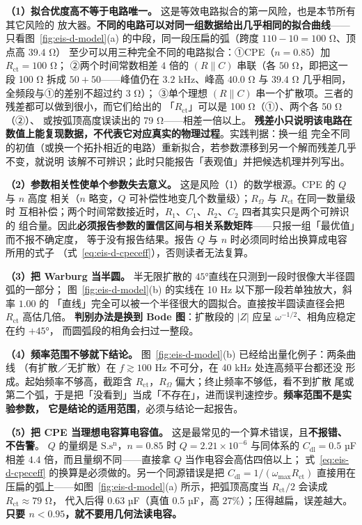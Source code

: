 \begin{pitfall}
\textbf{（1）拟合优度高不等于电路唯一。} 这是等效电路拟合的第一风险，也是本节所有其它风险的
放大器。\textbf{不同的电路可以对同一组数据给出几乎相同的拟合曲线}——只看图~\ref{fig:eis-d-model}(a)
的中段，同一段压扁的弧（跨度 $110-10=100$ \unit{\ohm}、顶点高 $39.4$ \unit{\ohm}）
至少可以用三种完全不同的电路拟合：①CPE（$n=0.85$）加 $R_{\mathrm{ct}}=100$ \unit{\ohm}；
②两个时间常数相差 $4$ 倍的 $(R\parallel C)$ 串联（各 $50$ \unit{\ohm}，即把这一段
100 \unit{\ohm} 拆成 $50+50$——峰值仍在 $3.2$ kHz、峰高 $40.0$ \unit{\ohm} 与
$39.4$ \unit{\ohm} 几乎相同，全频段与①的差别不超过约 $3$ \unit{\ohm}）；
③单个理想 $(R\parallel C)$ 串一个扩散项。三者的残差都可以做到很小，而它们给出的
「$R_{\mathrm{ct}}$」可以是 100 \unit{\ohm}（①）、两个各 50 \unit{\ohm}（②）、
或按弧顶高度误读出的 79 \unit{\ohm}——相差一倍以上。
\textbf{残差小只说明该电路在数值上能复现数据，不代表它对应真实的物理过程}。实践判据：换一组
完全不同的初值（或换一个拓扑相近的电路）重新拟合，若参数漂移到另一个解而残差几乎不变，就说明
该解不可辨识；此时只能报告「表观值」并把候选机理并列写出。

\textbf{（2）参数相关性使单个参数失去意义。} 这是风险（1）的数学根源。CPE 的 $Q$ 与 $n$ 高度
相关（$n$ 略变，$Q$ 可补偿性地变几个数量级）；$R_{\Omega}$ 与 $R_{\mathrm{ct}}$ 在同一数量级时
互相补偿；两个时间常数接近时，$R_{1}$、$C_{1}$、$R_{2}$、$C_{2}$ 四者其实只是两个可辨识的
组合量。因此\textbf{必须报告参数的置信区间与相关系数矩阵}——只报一组「最优值」而不报不确定度，
等于没有报告结果。报告 $Q$ 与 $n$ 时必须同时给出换算成电容所用的式子
（式~\eqref{eq:eis-d-cpeceff}），否则读者无法复算。

\textbf{（3）把 Warburg 当半圆。} 半无限扩散的 $45$°直线在只测到一段时很像大半径圆弧的一部分；
图~\ref{fig:eis-d-model}(b) 的实线在 10 Hz 以下那一段若单独放大，斜率 $1.00$ 的
「直线」完全可以被一个半径很大的圆拟合。直接按半圆读直径会把 $R_{\mathrm{ct}}$ 高估几倍。
\textbf{判别办法是换到 Bode 图}：扩散段的 $|Z|$ 应呈 $\omega^{-1/2}$、相角应稳定在约 $+45$°，
而圆弧段的相角会扫过一整段。

\textbf{（4）频率范围不够就下结论。} 图~\ref{fig:eis-d-model}(b) 已经给出量化例子：两条曲线
（有扩散／无扩散）在 $f\gtrsim 100$ Hz 不可分，在 40 kHz 处连高频平台都还没
形成。起始频率不够高，截距含 $R_{\mathrm{ct}}$，$R_{\Omega}$ 偏大；终止频率不够低，看不到扩散
尾或第二个弧，于是把「没看到」当成「不存在」，进而误判速控步。\textbf{频率范围不是实验参数，
它是结论的适用范围}，必须与结论一起报告。

\textbf{（5）把 CPE 当理想电容算电容值。} 这是最常见的一个算术错误，且\textbf{不报错、不告警}。
$Q$ 的量纲是 $\mathrm{S.s^{n}}$，$n=0.85$ 时 $Q=2.21\times10^{-6}$ 与同体系的
$C_{\mathrm{dl}}=0.5$ µF 相差 $4.4$ 倍，而且量纲不同——直接拿 $Q$ 当作电容会高估四倍以上；
式~\eqref{eq:eis-d-cpeceff} 的换算是必须做的。另一个同源错误是把
$C_{\mathrm{dl}}=1/(\omega_{\max}R_{\mathrm{ct}})$ 直接用在压扁的弧上——如图~\ref{fig:eis-d-model}(a)
所示，把弧顶高度当 $R_{\mathrm{ct}}/2$ 会读成 $R_{\mathrm{ct}}\approx79$ \unit{\ohm}，
代入后得 $0.63$ µF（真值 0.5 µF，高 $27\%$）；压得越扁，误差越大。
\textbf{只要 $n<0.95$，就不要用几何法读电容。}


\end{pitfall}
